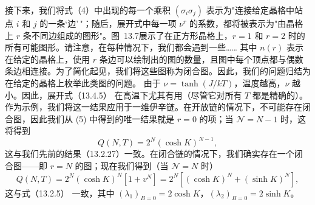 接下来，我们将式（4）中出现的每一个乘积 \((\sigma_{i}\sigma_{j})\) 表示为"连接给定晶格中站点 \(i\) 和 \(j\) 的一条`边'\,"；随后，展开式中每一项 \(\nu^{r}\) 的系数，都将被表示为"由晶格上 \(r\) 条不同边组成的图形"。图~13.7展示了在正方形晶格上，\(r=1\) 和 \(r=2\) 时的所有可能图形。请注意，在每种情况下，我们都会遇到一些\ldots\ldots{}
其中 \(n(r)\) 表示在给定的晶格上，使用 \(r\) 条边可以绘制出的图的数量，且图中每个顶点都与偶数条边相连接。为了简化起见，我们将这些图称为闭合图。因此，我们的问题归结为在给定的晶格上枚举此类图的问题。
由于 \(\nu=\tanh(J/kT)\)，温度越高，\(\nu\) 越小。因此，展开式（13.4.5） 在高温下尤其有用（尽管它对所有 \(T\) 都是精确的）。作为示例，我们将这一结果应用于一维伊辛链。在开放链的情况下，不可能存在闭合图，因此我们从 (5) 中得到的唯一结果就是 \(r=0\) 的项；当 \(\mathcal{N}=N-1\) 时，这将得到
\begin{equation}\tag{13.1.87}\label{eq:13.1.87}
Q ( N , T ) = 2 ^{N} ( \cosh K ) ^{N - 1} ,
\end{equation}
这与我们先前的结果（13.2.27）一致。在闭合链的情况下，我们确实存在一个闭合图——即 \(r = N\) 的图；现在我们得到（当 \(\mathcal{N} = N\) 时）
\begin{equation}\tag{13.1.88}\label{eq:13.1.88}
Q ( N , T ) = 2 ^{N} ( \cosh K ) ^{N} [ 1 + v ^{N} ] = 2 ^{N} [ ( \cosh K ) ^{N} + ( \sinh K ) ^{N} ] ,
\end{equation}
这与式（13.2.5） 一致，其中 \((\lambda_1)_{B=0} = 2\cosh K\)，\((\lambda_2)_{B=0} = 2\sinh K\)。
